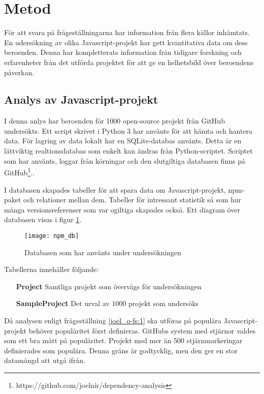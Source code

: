 \section{Metod}
\label{sec:joel_o-method}
För att svara på frågeställningarna har information från flera källor inhämtats. En udersökning av olika Javascript-projekt har gett kvantitativa data om dess beroenden. Denna har kompletterats information från tidigare forskning och erfarenheter från det utförda projektet för att ge en helhetsbild över beroendens påverkan.

\subsection{Analys av Javascript-projekt}
I denna anlys har beroenden för 1000 open-source projekt från GitHub undersökts. Ett script skrivet i Python 3 har använts för att hämta och hantera data. För lagring av data lokalt har en SQLite-databas använts. Detta är en lättviktig realtionsdatabas som enkelt kan ändras från Python-scriptet. Scriptet som har använts, loggar från körningar och den slutgiltiga databasen finns på GitHub\footnote{https://github.com/joelnir/dependency-analysis}..

I databasen skapades tabeller för att spara data om Javascript-projekt, npm-paket och relationer mellan dem. Tabeller för intressant statistik så som hur många versionsreferenser som var ogiltiga skapades också. Ett diagram över databasen visas i figur \ref{fig:dependency-db}.

\begin{figure}[h]
  \centering
  \texttt{[image: npm\_db]}
  \caption{Databasen som har använts under undersökningen}
  \label{fig:dependency-db}
\end{figure}

Tabellerna innehåller följande:

\begin{enumerate}[leftmargin=3cm]
  \item [\textbf{Project}] Samtliga projekt som övervägs för undersökningen
  \item [\textbf{SampleProject}] Det urval av 1000 projekt som undersöks
\end{enumerate}

Då analysen enligt frågeställning \ref{joel_o-fs:1} ska utföras på populära Javascript-projekt behöver populäritet först definieras. GitHubs system med stjärnor valdes som ett bra mått på populäritet. Projekt med mer än 500 stjärnmarkeringar definierades som populära. Denna gräns är godtycklig, men den ger en stor datamängd att utgå ifrån.



